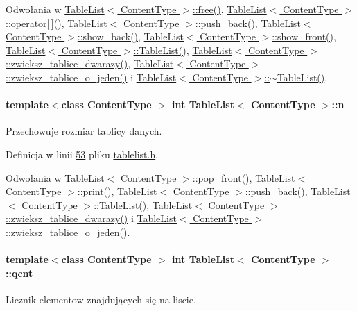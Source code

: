 Odwołania w \hyperlink{tablelist_8h_source_l00277}{Table\-List$<$ Content\-Type $>$\-::free()}, \hyperlink{tablelist_8h_source_l00263}{Table\-List$<$ Content\-Type $>$\-::operator\mbox{[}$\,$\mbox{]}()}, \hyperlink{tablelist_8h_source_l00188}{Table\-List$<$ Content\-Type $>$\-::push\-\_\-back()}, \hyperlink{tablelist_8h_source_l00177}{Table\-List$<$ Content\-Type $>$\-::show\-\_\-back()}, \hyperlink{tablelist_8h_source_l00138}{Table\-List$<$ Content\-Type $>$\-::show\-\_\-front()}, \hyperlink{tablelist_8h_source_l00093}{Table\-List$<$ Content\-Type $>$\-::\-Table\-List()}, \hyperlink{tablelist_8h_source_l00239}{Table\-List$<$ Content\-Type $>$\-::zwieksz\-\_\-tablice\-\_\-dwarazy()}, \hyperlink{tablelist_8h_source_l00222}{Table\-List$<$ Content\-Type $>$\-::zwieksz\-\_\-tablice\-\_\-o\-\_\-jeden()} i \hyperlink{tablelist_8h_source_l00117}{Table\-List$<$ Content\-Type $>$\-::$\sim$\-Table\-List()}.

\hypertarget{class_table_list_af60a60e1c22ab2e6f3745d5c1b5c1c1e}{
\paragraph[{n}]{\setlength{\rightskip}{0pt plus 5cm}template$<$class Content\-Type $>$ int {\bf Table\-List}$<$ Content\-Type $>$\-::n}}\label{class_table_list_af60a60e1c22ab2e6f3745d5c1b5c1c1e}
Przechowuje rozmiar tablicy danych. 

Definicja w linii \hyperlink{tablelist_8h_source_l00053}{53} pliku \hyperlink{tablelist_8h_source}{tablelist.\-h}.



Odwołania w \hyperlink{tablelist_8h_source_l00160}{Table\-List$<$ Content\-Type $>$\-::pop\-\_\-front()}, \hyperlink{tablelist_8h_source_l00268}{Table\-List$<$ Content\-Type $>$\-::print()}, \hyperlink{tablelist_8h_source_l00188}{Table\-List$<$ Content\-Type $>$\-::push\-\_\-back()}, \hyperlink{tablelist_8h_source_l00093}{Table\-List$<$ Content\-Type $>$\-::\-Table\-List()}, \hyperlink{tablelist_8h_source_l00239}{Table\-List$<$ Content\-Type $>$\-::zwieksz\-\_\-tablice\-\_\-dwarazy()} i \hyperlink{tablelist_8h_source_l00222}{Table\-List$<$ Content\-Type $>$\-::zwieksz\-\_\-tablice\-\_\-o\-\_\-jeden()}.

\hypertarget{class_table_list_a7a1afb80d51b9a3dae8b29cbc3335648}{
\paragraph[{qcnt}]{\setlength{\rightskip}{0pt plus 5cm}template$<$class Content\-Type $>$ int {\bf Table\-List}$<$ Content\-Type $>$\-::qcnt}}\label{class_table_list_a7a1afb80d51b9a3dae8b29cbc3335648}
Licznik elementow znajdujących się na liscie. 

